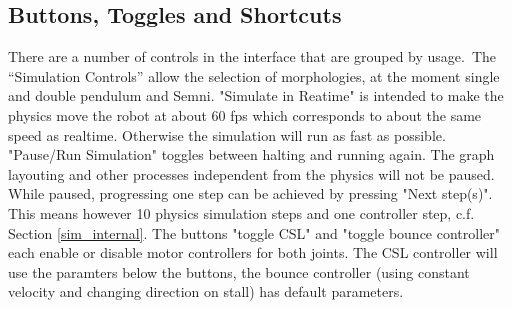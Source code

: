 \documentclass[10pt,a4paper]{article}
\begin{document}
\subsection{Buttons, Toggles and Shortcuts}

There are a number of controls in the interface that are grouped by usage.\
The ``Simulation Controls'' allow the selection of morphologies, at the moment single and double pendulum and Semni. "Simulate in Reatime" is intended to make the physics move the robot at about 60 fps which corresponds to about the same speed as realtime. Otherwise the simulation will run as fast as possible.
"Pause/Run Simulation" toggles between halting and running again. The graph layouting and other processes independent from the physics will not be paused. While paused, progressing one step can be achieved by pressing "Next step(s)". This means however 10 physics simulation steps and one controller step, c.f. Section \ref{sim_internal}.
The buttons "toggle CSL" and "toggle bounce controller" each enable or disable motor controllers for both joints. The CSL controller will use the paramters below the buttons, the bounce controller (using constant velocity and changing direction on stall) has default parameters.
\end{document}
